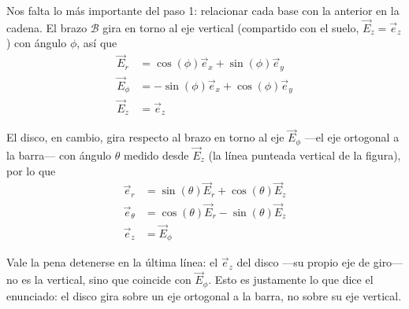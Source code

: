 \begin{tcolorbox}[%
        title= Solucion Disco en barra rotatoria vertical, breakable]
\begin{center}
\end{center}

Nos falta lo más importante del paso 1: relacionar cada base con la anterior en la cadena. El
brazo $\mathcal{B}$ gira en torno al eje vertical (compartido con el suelo, $\vec{E}_z=\vec{e}_z$)
con ángulo $\phi$, así que
\begin{equation*}
\begin{split}
    \vec{E}_r&=\cos(\phi)\vec{e}_x+\sin(\phi)\vec{e}_y\\
    \vec{E}_\phi&=-\sin(\phi)\vec{e}_x+\cos(\phi)\vec{e}_y\\
    \vec{E}_z&=\vec{e}_z
\end{split}
\end{equation*}

El disco, en cambio, gira respecto al brazo en torno al eje $\vec{E}_\phi$ —el eje ortogonal a la
barra— con ángulo $\theta$ medido desde $\vec{E}_z$ (la línea punteada vertical de la figura), por
lo que
\begin{equation*}
\begin{split}
    \vec{e}_r&=\sin(\theta)\vec{E}_r+\cos(\theta)\vec{E}_z\\
    \vec{e}_\theta&=\cos(\theta)\vec{E}_r-\sin(\theta)\vec{E}_z\\
    \vec{e}_z&=\vec{E}_\phi
\end{split}
\end{equation*}

Vale la pena detenerse en la última línea: el $\vec{e}_z$ del disco —su propio eje de giro— no es
la vertical, sino que coincide con $\vec{E}_\phi$. Esto es justamente lo que dice el enunciado:
el disco gira sobre un eje ortogonal a la barra, no sobre su eje vertical.


\end{tcolorbox}
